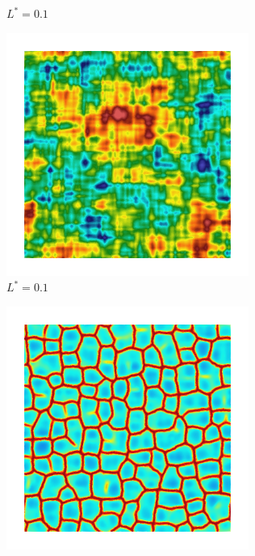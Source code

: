 \begin{figure}[!htbp]
\begin{subfigure}[b]{0.15\textwidth}
    \caption{$L^* = 0.1$}
    \label{fig: Chapter4/2D/Gc_exp_cartesian_10_10_rho_0_seed_b}
  \end{subfigure}
  \begin{subfigure}[b]{0.15\textwidth}
    \includegraphics[width=\textwidth]{Chapter4/figures/2D/psic_exp_cartesian_10_10_rho_0_seed_b.png}
    \caption{$L^* = 0.1$}
    \label{fig: Chapter4/2D/psic_exp_cartesian_10_10_rho_0_seed_b}
  \end{subfigure}
  \begin{subfigure}[b]{0.15\textwidth}
    \includegraphics[width=\textwidth]{Chapter4/figures/2D/d_exp_cartesian_10_10_rho_0_seed_b.png}
    \caption{}
    \label{fig: Chapter4/2D/d_exp_cartesian_10_10_rho_0_seed_b}
  \end{subfigure}
  

\end{figure}
